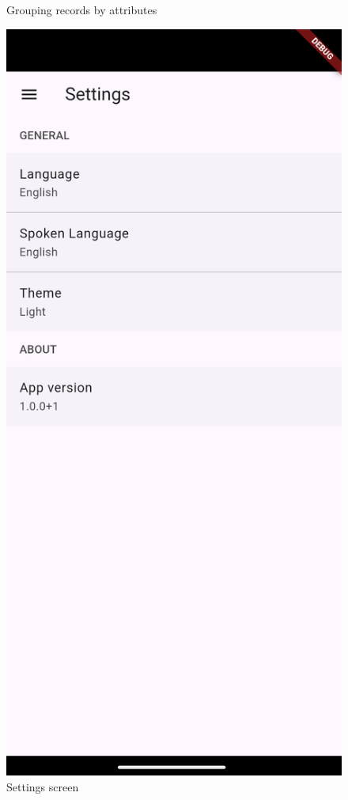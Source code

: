 \documentclass[
  digital,     %
  oneside,     %
  nosansbold,  %
  nocolorbold, %
  lof,         %
  lot,         %
]{fithesis4}
\begin{document}
\begin{center}
\begin{minipage}{0.45\textwidth}
\begin{figure}[H]
    \caption{Grouping records by attributes}
    \label{fig:group_records}
  \end{figure}
\end{minipage}
\hspace{0.05\textwidth}
\begin{minipage}{0.45\textwidth}
  \begin{figure}[H]
    \centering
    \includegraphics[width=\textwidth]{assets/settings_screen.png}
    \caption{Settings screen}
    \label{fig:settings_screen}
  \end{figure}
\end{minipage}
\end{center}
\end{document}
